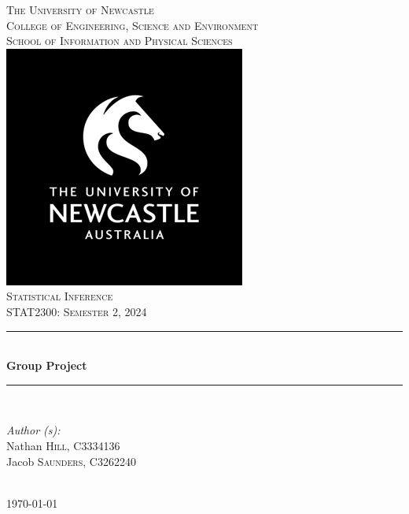 \documentclass[10pt]{article}
\newcommand{\HRule}{\rule{\linewidth}{0.5mm}}  %
\begin{document}


\begin{titlepage}
\center{}
\textsc{\LARGE The University of Newcastle}\\[0.5cm]
\textsc{\large College of Engineering, Science and Environment}\\[0.5cm]
\textsc{\large School of Information and Physical Sciences}\\[0.5cm]
\includegraphics[scale=.3]{assets/_uni_logo.png}\\[0.5cm]
\textsc{\Large Statistical Inference}\\[0.3cm]
\textsc{\Large STAT2300: Semester 2, 2024}\\[0.3cm]


\HRule{} \\[0.4cm]
{\huge \bfseries Group Project } \\ [0.4cm]
\HRule{} \\[1cm]


\begin{minipage}{1.0\textwidth}
\begin{flushleft} \large
\emph{Author (s):}\\
Nathan \textsc{Hill}, C3334136\\
Jacob \textsc{Saunders}, C3262240\\
\end{flushleft}
\end{minipage}\\[1.5cm]


\vfill %
{\large \today} \\ [1.5cm] %
\end{titlepage}
\end{document}
